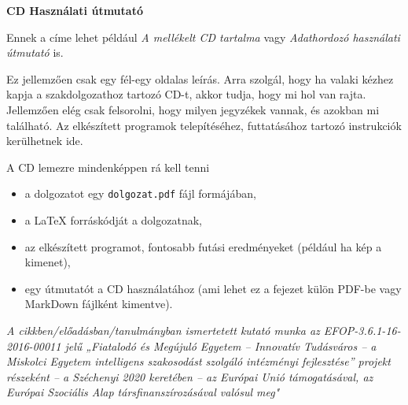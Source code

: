\pagestyle{empty}

\noindent \textbf{\Large CD Használati útmutató}

\vskip 1cm

Ennek a címe lehet például \textit{A mellékelt CD tartalma} vagy \textit{Adathordozó használati útmutató} is.

Ez jellemzően csak egy fél-egy oldalas leírás.
Arra szolgál, hogy ha valaki kézhez kapja a szakdolgozathoz tartozó CD-t, akkor tudja, hogy mi hol van rajta.
Jellemzően elég csak felsorolni, hogy milyen jegyzékek vannak, és azokban mi található.
Az elkészített programok telepítéséhez, futtatásához tartozó instrukciók kerülhetnek ide.

A CD lemezre mindenképpen rá kell tenni
\begin{itemize}
\item a dolgozatot egy \texttt{dolgozat.pdf} fájl formájában,
\item a LaTeX forráskódját a dolgozatnak,
\item az elkészített programot, fontosabb futási eredményeket (például ha kép a kimenet),
\item egy útmutatót a CD használatához (ami lehet ez a fejezet külön PDF-be vagy MarkDown fájlként kimentve).
\end{itemize}

\emph{A cikkben/előadásban/tanulmányban ismertetett kutató munka az
EFOP-3.6.1-16-2016-00011 jelű „Fiatalodó és Megújuló Egyetem –
Innovatív Tudásváros – a Miskolci Egyetem intelligens szakosodást
szolgáló intézményi fejlesztése” projekt részeként – a
Széchenyi 2020 keretében – az Európai Unió támogatásával, az
Európai Szociális Alap társfinanszírozásával valósul meg"}
